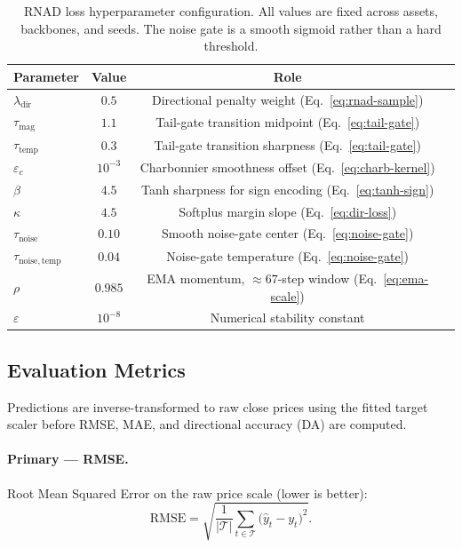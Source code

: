\documentclass[11pt]{article}
\newcommand{\RNAD}{RNAD\xspace}
\begin{document}
\begin{table}[t]
\centering
\caption{\RNAD loss hyperparameter configuration. All values are
  fixed across assets, backbones, and seeds. The noise gate is a
  smooth sigmoid rather than a hard threshold.}
\label{tab:hyperparams}
\small
\begin{tabularx}{\textwidth}{X c c c}
\toprule
Parameter                    & Value    & Role \\
\midrule
$\lambda_{\mathrm{dir}}$     & $0.5$    & Directional penalty weight (Eq.~\ref{eq:rnad-sample}) \\
$\tau_{\mathrm{mag}}$        & $1.1$    & Tail-gate transition midpoint (Eq.~\ref{eq:tail-gate}) \\
$\tau_{\mathrm{temp}}$       & $0.3$    & Tail-gate transition sharpness (Eq.~\ref{eq:tail-gate}) \\
$\varepsilon_c$              & $10^{-3}$ & Charbonnier smoothness offset (Eq.~\ref{eq:charb-kernel}) \\
$\beta$                      & $4.5$    & Tanh sharpness for sign encoding (Eq.~\ref{eq:tanh-sign}) \\
$\kappa$                     & $4.5$    & Softplus margin slope (Eq.~\ref{eq:dir-loss}) \\
$\tau_{\mathrm{noise}}$      & $0.10$   & Smooth noise-gate center (Eq.~\ref{eq:noise-gate}) \\
$\tau_{\mathrm{noise,temp}}$ & $0.04$   & Noise-gate temperature (Eq.~\ref{eq:noise-gate}) \\
$\rho$                       & $0.985$  & EMA momentum, $\approx 67$-step window (Eq.~\ref{eq:ema-scale}) \\
$\varepsilon$                & $10^{-8}$ & Numerical stability constant \\
\bottomrule
\end{tabularx}
\end{table}

\FloatBarrier

\subsection{Evaluation Metrics}

Predictions are inverse-transformed to raw close prices using the
fitted target scaler before RMSE, MAE, and directional accuracy (DA)
are computed.

\paragraph{Primary --- RMSE.}
Root Mean Squared Error on the raw price scale (lower is better):
\begin{equation}
  \mathrm{RMSE}
  = \sqrt{\frac{1}{|\mathcal{T}|}\sum_{t \in \mathcal{T}}
          \bigl(\hat{y}_t - y_t\bigr)^2}.
  \label{eq:rmse}
\end{equation}
\end{document}
